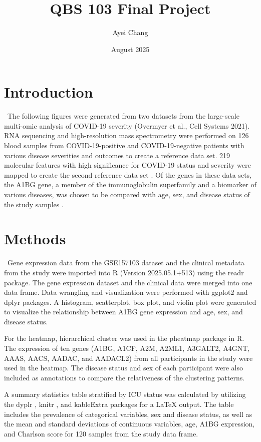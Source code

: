 \documentclass{article}
\title{QBS 103 Final Project}
\author{Ayei Chang}
\date{August 2025}
\begin{document}
\tableofcontents
\newpage

\maketitle

\section{Introduction}
\ The following figures were generated from two datasets from the large-scale multi-omic analysis of COVID-19 severity (Overmyer et al., Cell Systems 2021)\cite{overmyer_large-scale_2020}. RNA sequencing and high-resolution mass spectrometry were performed on 126 blood samples from COVID-19-positive and COVID-19-negative patients with various disease severities and outcomes to create a reference data set. 219 molecular features with high significance for COVID-19 status and severity were mapped to create the second reference data set \cite{overmyer_large-scale_2020}. Of the genes in these data sets, the A1BG gene, a member of the immunoglobulin superfamily and a biomarker of various diseases, was chosen to be compared with age, sex, and disease status of the study samples \cite{el_atab_alpha-1-b_2024}. 


\section{Methods}
\ Gene expression data from the GSE157103 dataset and the clinical metadata from the study were imported into R (Version 2025.05.1+513) using the readr \cite{readr} package. The gene expression dataset and the clinical data were merged into one data frame. Data wrangling and visualization were performed with ggplot2 \cite{ggplot2} and dplyr \cite{dplyr} packages. A histogram, scatterplot, box plot, and violin plot were generated to visualize the relationship between A1BG gene expression and age, sex, and disease status.

For the heatmap, hierarchical cluster was used in the pheatmap \cite{pheatmap} package in R. The expression of ten genes (A1BG, A1CF, A2M, A2ML1, A3GALT2, A4GNT, AAAS, AACS, AADAC, and AADACL2) from all participants in the study were used in the heatmap. The disease status and sex of each participant were also included as annotations to compare the relativeness of the clustering patterns. 

A summary statistics table stratified by ICU status was calculated by utilizing the dyplr \cite{dplyr}, knitr \cite{knitr}, and kableExtra \cite{kableExtra} packages for a LaTeX output. The table includes the prevalence of categorical variables, sex and disease status, as well as the mean and standard deviations of continuous variables, age, A1BG expression, and Charlson score for 120 samples from the study data frame. 
\end{document}
